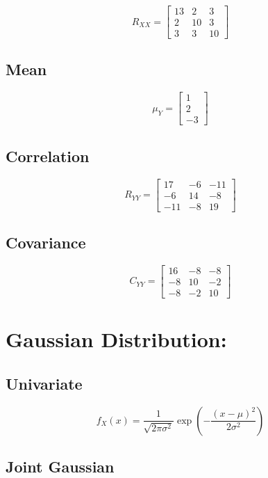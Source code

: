 \documentclass[11pt]{article}
\begin{document}
\[
R_{XX} =
\begin{bmatrix}
13 & 2 & 3 \\
2 & 10 & 3 \\
3 & 3 & 10
\end{bmatrix}
\]

\subsection*{Mean}

\[
\mu_Y =
\begin{bmatrix}
1 \\ 2 \\ -3
\end{bmatrix}
\]

\subsection*{Correlation}

\[
R_{YY} =
\begin{bmatrix}
17 & -6 & -11 \\
-6 & 14 & -8 \\
-11 & -8 & 19
\end{bmatrix}
\]

\subsection*{Covariance}

\[
C_{YY} =
\begin{bmatrix}
16 & -8 & -8 \\
-8 & 10 & -2 \\
-8 & -2 & 10
\end{bmatrix}
\]

\section{Gaussian Distribution:}

\subsection*{Univariate}

\[
f_X(x) = \frac{1}{\sqrt{2\pi\sigma^2}} 
\exp\left(-\frac{(x-\mu)^2}{2\sigma^2}\right)
\]

\subsection*{Joint Gaussian}
\end{document}
